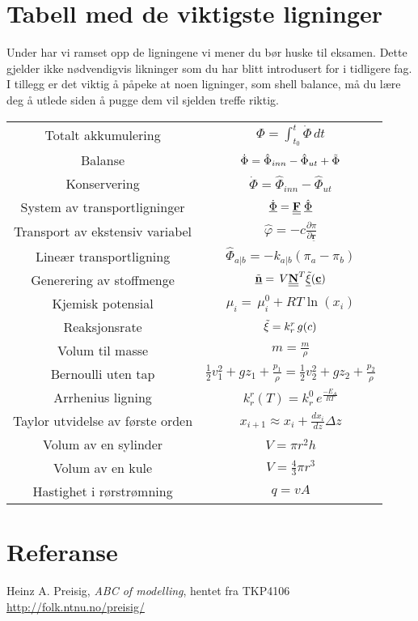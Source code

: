 \clearpage
\section{Tabell med de viktigste ligninger}
Under har vi ramset opp de ligningene vi mener du bør huske til eksamen. Dette gjelder ikke nødvendigvis likninger som du har blitt introdusert for i tidligere fag. I tillegg er det viktig å påpeke at noen ligninger, som shell balance, må du lære deg å utlede siden å pugge dem vil sjelden treffe riktig. 
\begin{table}[H]
    \centering
    \begin{tabular}{c|c}
        Totalt akkumulering & $\Phi = \int_{t_0}^{t}\dot{\Phi}\,dt $  \\[0.2cm]
         Balanse  & $\dot{\Phi} = \hat{\Phi}_{inn} - \hat{\Phi}_{ut} + \Tilde{\Phi}$ \\[0.2cm]
         Konservering & $\dot{\Phi} = \hat{\Phi}_{inn} - \hat{\Phi}_{ut} $\\[0.2cm]
         System av transportligninger & $\underline{\dot{\Phi}} = \textbf{\underline{\underline{F}}}\hspace{0.1cm}\underline{\hat{\Phi}}$ \\[0.2cm]
         Transport av ekstensiv variabel & $\hat{\varphi} = -c\frac{\partial \pi}{\partial \underline{\textbf{r}}}$ \\[0.2cm]
         Lineær transportligning & $\hat{\Phi}_{a|b} = -k_{a|b}(\pi_a-\pi_b)$ \\[0.2cm] 
         Generering av stoffmenge & $\underline{\Tilde{\textbf{n}}}=\,V\underline{\underline{\textbf{N}}}^T\underline{\Tilde{\xi}}(\underline{\textbf{c}})$ \\[0.2cm]
         Kjemisk potensial & $\mu_i =\, \mu_{i}^0 + RT\ln (x_i)$ \\[0.2cm]
         Reaksjonsrate & $\Tilde{\xi} = k^r_r\,g(c)$ \\[0.2cm]
         Volum til masse & $m = \frac{m}{\rho}$\\[0.2cm]
         Bernoulli uten tap& 
    $\frac{1}{2}v_1^2 + gz_1 + \frac{p_1}{\rho} = \frac{1}{2}v_2^2 + gz_2 + \frac{p_2}{\rho}$ \\[0.2cm]
         Arrhenius ligning & $k^r_r(T) =k^0_r\,e^{\frac{-E_{A}}{RT}}$ \\[0.2cm]
         Taylor utvidelse av første orden & $x_{i+1} \approx x_i + \frac{dx_i}{dz}\Delta z$ \\[0.2cm]
         Volum av en sylinder & $V=\pi r^2h$\\[0.2cm]
         Volum av en kule & $V=\frac{4}{3}\pi r^3$\\[0.2cm]
         Hastighet i rørstrømning & $q = vA$\\[0.2cm]
         
    \end{tabular}
    \label{tab:my_label}
\end{table}

\appendix
\section{Referanse}
Heinz A. Preisig, \textit{ABC of modelling}, hentet fra TKP4106 \url{http://folk.ntnu.no/preisig/}